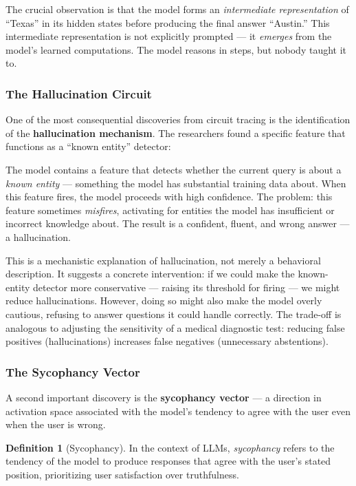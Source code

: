 \documentclass[11pt, a4paper]{article}
\theoremstyle{definition}
\newtheorem{definition}{Definition}[section]
\theoremstyle{plain}
\begin{document}
The crucial observation is that the model forms an \emph{intermediate
representation} of ``Texas'' in its hidden states before producing the
final answer ``Austin.''  This intermediate representation is not
explicitly prompted --- it \emph{emerges} from the model's learned
computations.  The model reasons in steps, but nobody taught it to.

\subsubsection{The Hallucination Circuit}

One of the most consequential discoveries from circuit tracing is the
identification of the \textbf{hallucination mechanism}.  The researchers
found a specific feature that functions as a ``known entity'' detector:

\begin{keyinsight}[title={The Hallucination Circuit}]
The model contains a feature that detects whether the current query
is about a \emph{known entity} --- something the model has substantial
training data about.  When this feature fires, the model proceeds with
high confidence.  The problem: this feature sometimes \emph{misfires},
activating for entities the model has insufficient or incorrect knowledge
about.  The result is a confident, fluent, and wrong answer --- a
hallucination.
\end{keyinsight}

This is a mechanistic explanation of hallucination, not merely a
behavioral description.  It suggests a concrete intervention: if we
could make the known-entity detector more conservative --- raising its
threshold for firing --- we might reduce hallucinations.  However, doing
so might also make the model overly cautious, refusing to answer questions
it could handle correctly.  The trade-off is analogous to adjusting the
sensitivity of a medical diagnostic test: reducing false positives
(hallucinations) increases false negatives (unnecessary abstentions).

\subsubsection{The Sycophancy Vector}

A second important discovery is the \textbf{sycophancy vector} --- a
direction in activation space associated with the model's tendency to
agree with the user even when the user is wrong.

\begin{definition}[Sycophancy]
In the context of LLMs, \emph{sycophancy} refers to the tendency of the
model to produce responses that agree with the user's stated position,
prioritizing user satisfaction over truthfulness.
\end{definition}
\end{document}
